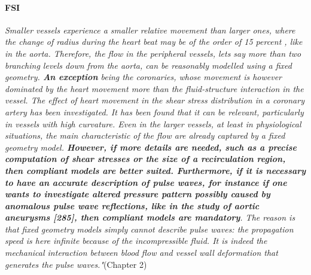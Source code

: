 \documentclass[11pt,letterpaper]{article}
\begin{document}
\paragraph{FSI} \textit{Smaller vessels experience a smaller relative movement than larger ones, where the change of radius during the heart beat may be of the order of 15 percent , like in the aorta. Therefore, the flow in the peripheral vessels, lets say more than two branching levels down from the aorta, can be reasonably modelled using a fixed geometry. \textbf{An exception} being the coronaries, whose movement is however dominated by the heart movement more than the fluid-structure interaction in the vessel. The effect of heart movement in the shear stress distribution in a coronary artery has been investigated. It has been found that it can be relevant, particularly in vessels with high curvature. Even in the larger vessels, at least in physiological situations, the main
characteristic of the flow are already captured by a fixed geometry model. \textbf{However, if more details are needed, such as a precise computation of shear stresses or the size of a recirculation region, then compliant models are better suited. Furthermore, if it is necessary to have an accurate description of pulse waves, for instance if one wants to investigate altered pressure pattern possibly caused by anomalous pulse wave reflections, like in the study of aortic aneurysms [285], then compliant models are mandatory}. The reason is that fixed geometry models simply cannot describe pulse waves: the propagation speed is here infinite because of the incompressible fluid. It is indeed the mechanical interaction between blood flow and vessel wall deformation that generates the pulse waves."}(Chapter 2)
\end{document}
